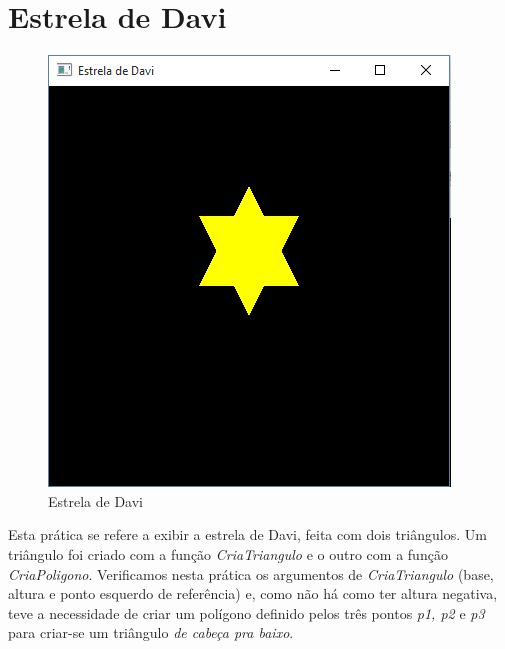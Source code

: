 \section{Estrela de Davi}
\begin{figure}[ht]
  \centerline{\includegraphics[width=.5\textwidth]{img/cap1_ex2.png}}
  \caption{Estrela de Davi}
  \label{fig:cap01_ex1}
\end{figure}
Esta prática se refere a exibir a estrela de Davi, feita com dois triângulos. Um triângulo foi criado com a função \emph{CriaTriangulo} e o outro com a função \emph{CriaPoligono}. Verificamos nesta prática os argumentos de \emph{CriaTriangulo} (base, altura e ponto esquerdo de referência) e, como não há como ter altura negativa, teve a necessidade de criar um polígono definido pelos três pontos \emph{p1, p2} e \emph{p3} para criar-se um triângulo \emph{de cabeça pra baixo}.


